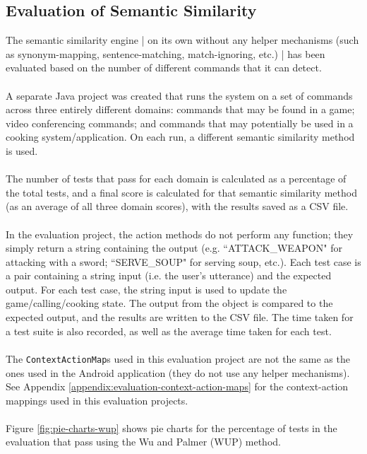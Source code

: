 \documentclass[11pt]{article}
\begin{document}
\subsection{Evaluation of Semantic Similarity}
\label{section:eval-similarity}

The semantic similarity engine | on its own without any helper mechanisms (such as synonym-mapping, sentence-matching, match-ignoring, etc.) | has been evaluated based on the number of different commands that it can detect.
\\
\\
A separate Java project was created that runs the system on a set of commands across three entirely different domains: commands that may be found in a game; video conferencing commands; and commands that may potentially be used in a cooking system/application. On each run, a different semantic similarity method is used.
\\
\\
The number of tests that pass for each domain is calculated as a percentage of the total tests, and a final score is calculated for that semantic similarity method (as an average of all three domain scores), with the results saved as a CSV file.
\\
\\
In the evaluation project, the action methods do not perform any function; they simply return a string containing the output (e.g. ``ATTACK\_WEAPON" for attacking with a  sword; ``SERVE\_SOUP" for serving soup, etc.). Each test case is a pair containing a string input (i.e. the user's utterance) and the expected output. For each test case, the string input is used to update the game/calling/cooking state. The output from the object is compared to the expected output, and the results are written to the CSV file. The time taken for a test suite is also recorded, as well as the average time taken for each test.
\\
\\
The \texttt{ContextActionMap}s used in this evaluation project are not the same as the ones used in the Android application (they do not use any helper mechanisms). See Appendix \ref{appendix:evaluation-context-action-maps} for the context-action mappings used in this evaluation projects.
\\
\\
Figure \ref{fig:pie-charts-wup} shows pie charts for the percentage of tests in the evaluation that pass using the Wu and Palmer (WUP) method.
\\
\end{document}
